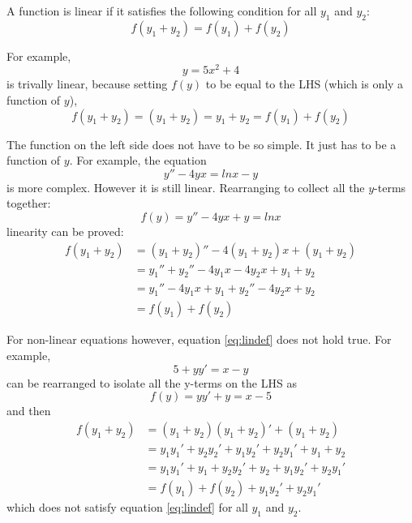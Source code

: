 A function is linear if it satisfies the following condition for all $y_1$ and $y_2$:
\begin{equation}
    \label{eq:lindef}
    f(y_1 + y_2)  = f(y_1) + f(y_2)
\end{equation}

For example,
\begin{equation*}
    y = 5x^2 + 4
\end{equation*}
is trivally linear, because setting $f(y)$ to be equal to the LHS (which is only a function of $y$),
\begin{equation*}
    f(y_1 + y_2) = (y_1+y_2) = y_1 + y_2 = f(y_1) + f(y_2)
\end{equation*}

The function on the left side does not have to be so simple. It just has to be a function of $y$. For example, the equation
\begin{equation*}
    y'' - 4yx = ln x - y
\end{equation*}
is more complex. However it is still linear. Rearranging to collect all the $y$-terms together:
\begin{equation*}
    f(y) = y'' - 4yx + y = ln x
\end{equation*}
linearity can be proved:
\begin{align*}
    f(y_1 + y_2) &= (y_1 + y_2)'' - 4(y_1 + y_2)x + (y_1 + y_2) \\
                 &= y_1'' + y_2'' - 4y_1x - 4y_2x + y_1 + y_2 \\
                 &= y_1'' - 4y_1x + y_1 + y_2'' - 4y_2x + y_2 \\
                 &= f(y_1) + f(y_2)
\end{align*}

For non-linear equations however, equation \ref{eq:lindef} does not hold true. For example,
\begin{equation*}
    5 + yy' = x - y
\end{equation*}
can be rearranged to isolate all the y-terms on the LHS as
\begin{equation*}
    f(y) = yy' + y = x - 5
\end{equation*}
and then
\begin{align*}
    f(y_1 + y_2) &= (y_1 + y_2)(y_1+y_2)' + (y_1 + y_2) \\
                 &= y_1 y_1' + y_2 y_2' + y_1 y_2' + y_2 y_1' + y_1 + y_2 \\
                 &= y_1 y_1' + y_1 + y_2 y_2' + y_2 + y_1 y_2' + y_2 y_1' \\
                 &= f(y_1) + f(y_2) + y_1 y_2' + y_2 y_1'
\end{align*}
which does not satisfy equation \ref{eq:lindef} for all $y_1$ and $y_2$.

